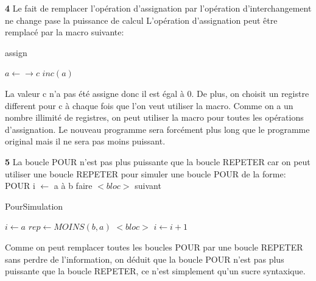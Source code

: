 \documentclass{article}
\begin{document}
    \textbf{4}
    Le fait de remplacer l'opération d'assignation par l'opération  d'interchangement ne change pase la puissance de calcul
    L'opération d'assignation peut être remplacé par la macro suivante:
    
    \begin{algorithm}[H]
        \caption{assign}\label{assign}
        \begin{algorithmic}
        \State $\textit{$a$} \leftarrow \rightarrow \textit{$c$}$
            \State $inc(a)$
        \EndFor
        \EndProcedure
        \end{algorithmic}
    \end{algorithm}

    La valeur c n'a pas été assigne donc il est égal à 0.
    De plus, on choisit un registre different pour c à chaque fois que l'on veut utiliser la macro.
    Comme on a un nombre illimité de registres, on peut utiliser la macro pour toutes les opérations d'assignation.
    Le nouveau programme sera forcément plus long que le programme original mais il ne sera pas moins puissant.

    \textbf{5}
    La boucle POUR n'est pas plus puissante que la boucle REPETER car on peut utiliser une boucle REPETER pour
    simuler une boucle POUR de la forme:\newline
    POUR i $\leftarrow$ a à b faire $<bloc>$ suivant

    \begin{algorithm}[H]
        \caption{PourSimulation}\label{PourSimulation}
        \begin{algorithmic}
        \State $\textit{$i$} \gets a$
        \State $\textit{$rep$} \gets MOINS(b, a)$
            \State $<bloc>$
            \State $\textit{$i$} \gets i + 1$
        \EndFor
        \EndProcedure
        \end{algorithmic}
    \end{algorithm}

    Comme on peut remplacer toutes les boucles POUR par une boucle REPETER sans perdre de l'information, 
    on déduit que la boucle POUR n'est pas plus puissante que la boucle REPETER, ce n'est simplement qu'un sucre syntaxique.
\end{document}
